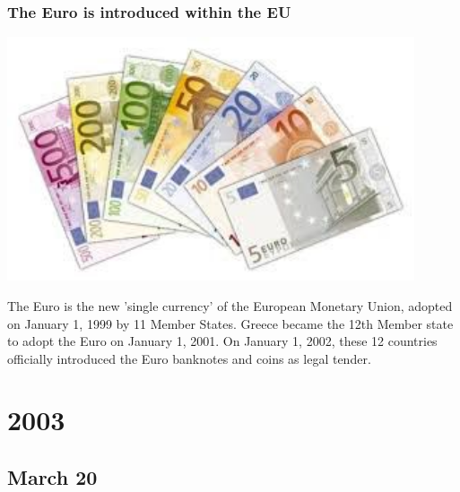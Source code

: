 \documentclass[11pt]{report}
\begin{document}
\subsection{The Euro is introduced within the EU}
\vspace{2mm}\begin{center}\includegraphics[width=12cm]{./img/euro.jpg}\end{center}
The Euro is the new 'single currency' of the European Monetary Union, adopted on January 1, 1999 by 11 Member States. Greece became the 12th Member state to adopt the Euro on January 1, 2001. On January 1, 2002, these 12 countries officially introduced the Euro banknotes and coins as legal tender.

\chapter{2003}
\section{March 20}
\end{document}
